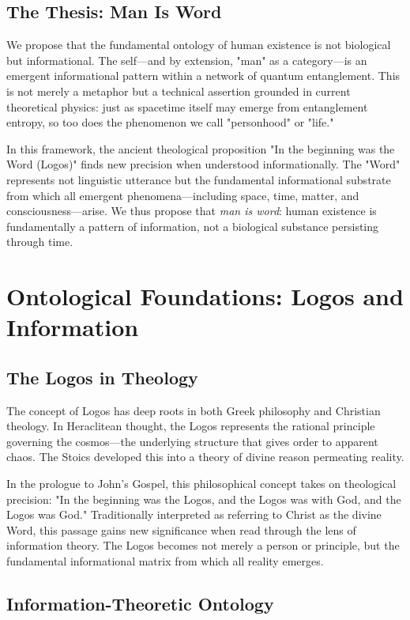\documentclass[12pt]{article}
\begin{document}
\subsection{The Thesis: Man Is Word}

We propose that the fundamental ontology of human existence is not biological but informational. The self—and by extension, "man" as a category—is an emergent informational pattern within a network of quantum entanglement. This is not merely a metaphor but a technical assertion grounded in current theoretical physics: just as spacetime itself may emerge from entanglement entropy, so too does the phenomenon we call "personhood" or "life."

In this framework, the ancient theological proposition "In the beginning was the Word (Logos)" finds new precision when understood informationally. The "Word" represents not linguistic utterance but the fundamental informational substrate from which all emergent phenomena—including space, time, matter, and consciousness—arise. We thus propose that \emph{man is word}: human existence is fundamentally a pattern of information, not a biological substance persisting through time.

\section{Ontological Foundations: Logos and Information}

\subsection{The Logos in Theology}

The concept of Logos has deep roots in both Greek philosophy and Christian theology. In Heraclitean thought, the Logos represents the rational principle governing the cosmos—the underlying structure that gives order to apparent chaos. The Stoics developed this into a theory of divine reason permeating reality. 

In the prologue to John's Gospel, this philosophical concept takes on theological precision: "In the beginning was the Logos, and the Logos was with God, and the Logos was God." Traditionally interpreted as referring to Christ as the divine Word, this passage gains new significance when read through the lens of information theory. The Logos becomes not merely a person or principle, but the fundamental informational matrix from which all reality emerges.

\subsection{Information-Theoretic Ontology}
\end{document}
